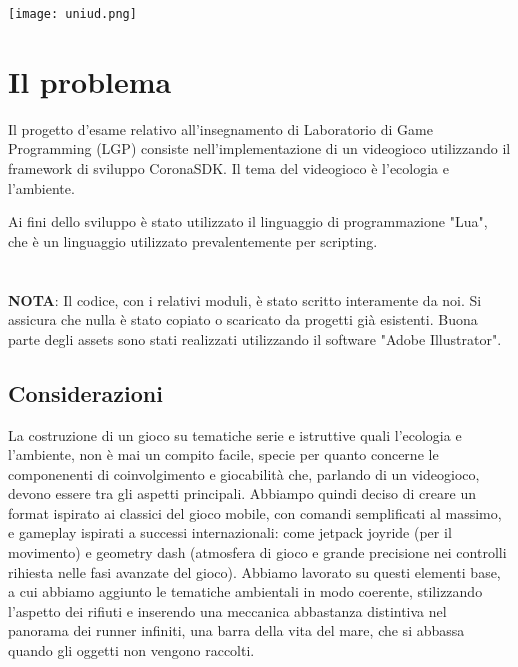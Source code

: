 \documentclass[12pt]{article}
\begin{document}
\begin{titlepage}



\texttt{[image: uniud.png]}\\[1cm] %
 

\vfill %

\end{titlepage}
\tableofcontents
\clearpage
\section{Il problema}
Il progetto d’esame relativo all’insegnamento di Laboratorio di Game Programming (LGP) consiste nell’implementazione di un videogioco utilizzando il framework di sviluppo CoronaSDK. Il tema del videogioco è l'ecologia e l'ambiente. 

Ai fini dello sviluppo è stato utilizzato il linguaggio di programmazione "Lua", che è un linguaggio utilizzato prevalentemente per scripting.
\\

\\\\
\textbf{NOTA}: Il codice, con i relativi moduli, è stato scritto interamente da noi. Si assicura che nulla è stato copiato o scaricato da progetti già esistenti. Buona parte degli assets sono stati realizzati utilizzando il software "Adobe Illustrator".
\subsection{Considerazioni}
La costruzione di un gioco su tematiche serie e istruttive quali l'ecologia e l'ambiente, non è mai un compito facile, specie per quanto concerne le componenenti di coinvolgimento e giocabilità che, parlando di un videogioco, devono essere tra gli aspetti principali. Abbiampo quindi deciso di creare un format ispirato ai classici del gioco mobile, con comandi semplificati al massimo, e gameplay ispirati a successi internazionali: come jetpack joyride (per il movimento) e geometry dash (atmosfera di gioco e grande precisione nei controlli rihiesta nelle fasi avanzate del gioco). Abbiamo lavorato su questi elementi base, a cui abbiamo aggiunto le tematiche ambientali in modo coerente, stilizzando l'aspetto dei rifiuti e inserendo una meccanica abbastanza distintiva nel panorama dei runner infiniti, una barra della vita del mare, che si abbassa quando gli oggetti non vengono raccolti.
\end{document}
